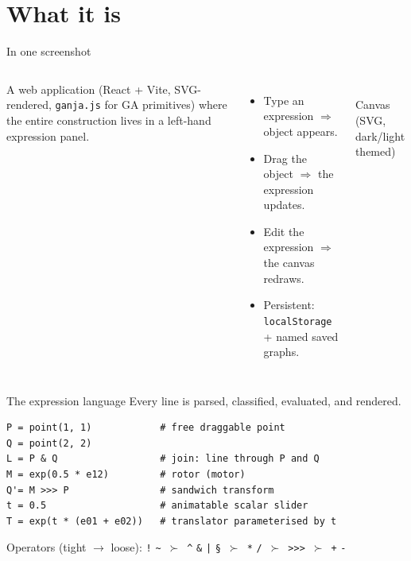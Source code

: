 \documentclass[aspectratio=169,11pt]{beamer}
\begin{document}
\section{What it is}

\begin{frame}{In one screenshot}
  \begin{columns}[T]
      A web application (React + Vite, SVG-rendered, \texttt{ganja.js}
      for GA primitives) where the entire construction lives in a
      left-hand expression panel.
      \begin{itemize}
        \item Type an expression \(\Rightarrow\) object appears.
        \item Drag the object \(\Rightarrow\) the expression updates.
        \item Edit the expression \(\Rightarrow\) the canvas redraws.
        \item Persistent: \texttt{localStorage} + named saved graphs.
      \end{itemize}

      \begin{center}
        \\[4pt]
        \footnotesize Canvas (SVG, dark/light themed)
      \end{center}
  \end{columns}
\end{frame}

\begin{frame}[fragile]{The expression language}
  Every line is parsed, classified, evaluated, and rendered.
\begin{lstlisting}
P = point(1, 1)            # free draggable point
Q = point(2, 2)
L = P & Q                  # join: line through P and Q
M = exp(0.5 * e12)         # rotor (motor)
Q'= M >>> P                # sandwich transform
t = 0.5                    # animatable scalar slider
T = exp(t * (e01 + e02))   # translator parameterised by t
\end{lstlisting}
  \medskip
  Operators (tight $\to$ loose):
  \texttt{!} \texttt{\textasciitilde}\ $\succ$\
  \texttt{\textasciicircum} \texttt{\&} \texttt{|} \texttt{\S}\ $\succ$\
  \texttt{*} \texttt{/}\ $\succ$\
  \texttt{>{>}>}\ $\succ$\
  \texttt{+} \texttt{-}
\end{frame}
\end{document}
